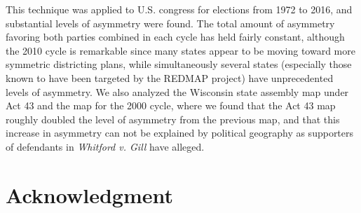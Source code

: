 \documentclass[preprint,12pt]{article}
\begin{document}
This technique was applied to U.S. congress for elections from 1972 to 2016, and substantial levels of asymmetry were found.
The total amount of asymmetry favoring both parties combined in each cycle has held fairly constant, although the 2010 cycle is remarkable since many states appear to be moving toward more symmetric districting plans, while simultaneously several states (especially those known to have been targeted by the REDMAP project) have unprecedented levels of asymmetry.
We also analyzed the Wisconsin state assembly map under Act 43 and the map for the 2000 cycle, where we found that the Act 43 map roughly doubled the level of asymmetry from the previous map, and that this increase in asymmetry can not be explained by political geography as supporters of defendants in \emph{Whitford v. Gill} have alleged.


\clearpage
\section*{Acknowledgment}
\section*{}


\clearpage
\end{document}
